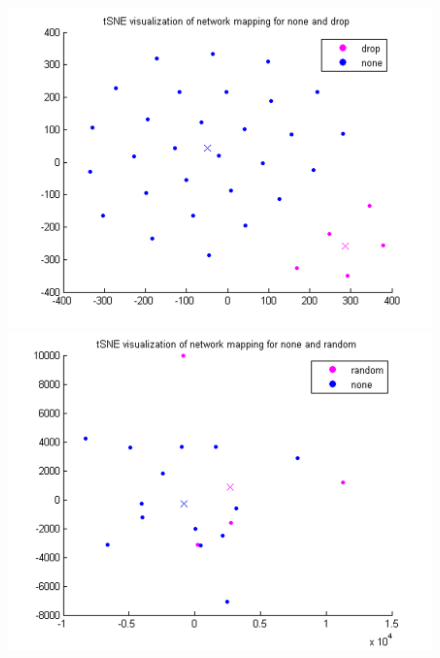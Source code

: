 \documentclass{article} %
\begin{document}
\begin{figure}[ht] 
  \label{fig:tSNE_plots} 
  \begin{minipage}[b]{0.5\linewidth}
    \centering
    \includegraphics[width=\linewidth]{A-tSNE_drop-none.png} 
    \vspace{4ex}
  \end{minipage}%
  \begin{minipage}[b]{0.5\linewidth}
    \centering
    \includegraphics[width=\linewidth]{A-tSNE_random-none.png} 
    \vspace{4ex}
  \end{minipage} 
  \begin{minipage}[b]{0.5\linewidth}

\end{minipage}
\end{figure}
\end{document}
